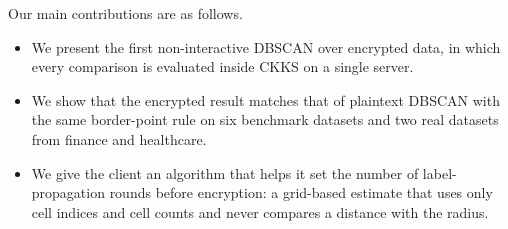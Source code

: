 Our main contributions are as follows.
\begin{itemize}
  \item We present the first non-interactive DBSCAN over encrypted data,
    in which every comparison is evaluated inside CKKS on a single server.
  \item We show that the encrypted result matches that of plaintext DBSCAN
    with the same border-point rule on six benchmark datasets and two
    real datasets from finance and healthcare.
  \item We give the client an algorithm that helps it set the number of
    label-propagation rounds before encryption: a grid-based estimate
    that uses only cell indices and cell counts and never compares a
    distance with the radius.
\end{itemize}